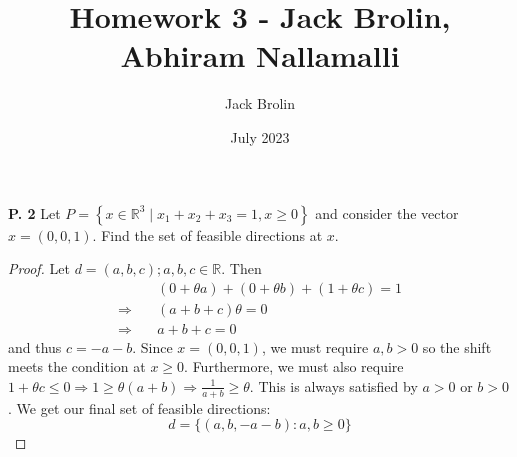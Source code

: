 \documentclass{article}
\title{Homework 3 - Jack Brolin, Abhiram Nallamalli}
\author{Jack Brolin}
\date{July 2023}
\begin{document}
\maketitle

\begin{jacklist}
    \begin{framed} 
    \item [\textbf{P. 2}] Let $P=\left\{x \in \mathbb{R}^{3} \mid x_{1}+x_{2}+x_{3}=1, x \geq 0\right\}$ and consider the vector 
        $x=(0,0,1)$. Find the set of feasible directions at $x$.
    \end{framed}
    \begin{proof}
        Let $d = (a,b,c); a,b,c \in \mathbb{R}$. Then 
        \begin{align*}
            &(0 + \theta a) + (0 + \theta b ) + (1 + \theta c) = 1 \\
            \Rightarrow \quad &(a + b + c)\theta  = 0 \\
            \Rightarrow \quad &a + b + c = 0 
        \end{align*}
        and thus $c = -a - b$. Since $x = (0,0,1)$, we must require $a,b > 0$ so the shift meets the condition at $x \geq 0$. 
        Furthermore, we must also require $1 + \theta c \leq 0 \Rightarrow 1 \geq \theta(a+b) \Rightarrow \frac{1}{a+b} \geq \theta$.
        This is always satisfied by $a > 0$ or $b > 0$. We get our final set of feasible directions: 
        \[ 
            d = \{(a,b,-a-b) : a,b \geq 0 \}
        \] 
    \end{proof}


\end{jacklist}
\end{document}
